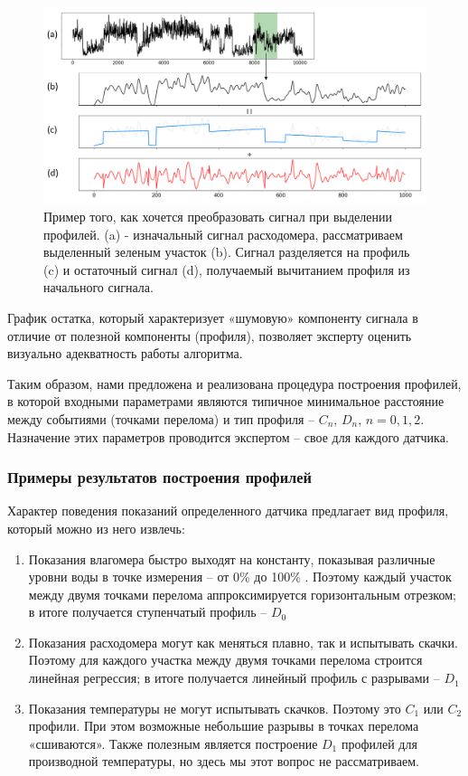 \begin{figure}[H]
\centering
\includegraphics[width=1\textwidth]{PLT/dpl_deconstruction.png}
\caption{Пример того, как хочется преобразовать сигнал при выделении профилей. (a) - изначальный сигнал расходомера, рассматриваем выделенный зеленым участок (b). Сигнал разделяется на профиль (c) и остаточный сигнал (d), получаемый вычитанием профиля из начального сигнала.}
\label{fig:dpl_deconstruction}
\end{figure}

\par
График остатка, который характеризует «шумовую» компоненту сигнала в отличие от полезной компоненты (профиля), позволяет эксперту оценить визуально адекватность работы алгоритма.  
\par
Таким образом, нами предложена и реализована процедура построения профилей, в которой входными параметрами являются типичное минимальное расстояние между событиями (точками перелома) и тип профиля – $C_n$, $D_n$, $n=0,1,2$. Назначение этих параметров проводится экспертом – свое для каждого датчика. 

\subsubsection{Примеры результатов построения профилей}
\par
Характер поведения показаний определенного датчика предлагает вид профиля, который можно из него извлечь:
\begin{enumerate}[label=\arabic*.]
    \item Показания влагомера быстро выходят на константу, показывая различные уровни воды в точке измерения – от 0\% до 100\% . Поэтому каждый участок между двумя точками перелома аппроксимируется горизонтальным отрезком; в итоге получается ступенчатый профиль – $D_0$
    \item Показания расходомера могут как меняться плавно, так и испытывать скачки. Поэтому для каждого участка между двумя точками перелома строится линейная регрессия; в итоге получается линейный профиль с разрывами – $D_1$
    \item Показания температуры не могут испытывать скачков. Поэтому это $C_1$ или $C_2$ профили. При этом возможные небольшие разрывы в точках перелома «сшиваются». Также полезным является построение $D_1$ профилей для производной температуры, но здесь мы этот вопрос не рассматриваем.
\end{enumerate}

